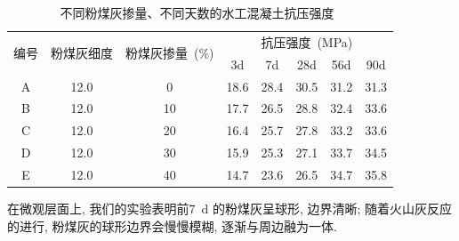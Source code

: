 \begin{table}[!t]
  \centering
  \caption{不同粉煤灰掺量、不同天数的水工混凝土抗压强度~\cite{mu_fa}}
  \begin{tabular}{|c|c|c|ccccc|}
    \hline
    \multirow{2}{*}{编号} & \multirow{2}{*}{粉煤灰细度} & \multirow{2}{*}{粉煤灰掺量~(\unit{\percent})} & \multicolumn{5}{c|}{抗压强度~(\unit{\mega\pascal})}                                                                  \\ \cline{4-8}
                          &                             &                                               & \multicolumn{1}{c|}{3d}   & \multicolumn{1}{c|}{7d}   & \multicolumn{1}{c|}{28d}  & \multicolumn{1}{c|}{56d}  & 90d  \\ \hline
    A                     & 12.0                        & 0                                             & \multicolumn{1}{c|}{18.6} & \multicolumn{1}{c|}{28.4} & \multicolumn{1}{c|}{30.5} & \multicolumn{1}{c|}{31.2} & 31.3 \\ \hline
    B                     & 12.0                        & 10                                            & \multicolumn{1}{c|}{17.7} & \multicolumn{1}{c|}{26.5} & \multicolumn{1}{c|}{28.8} & \multicolumn{1}{c|}{32.4} & 33.6 \\ \hline
    C                     & 12.0                        & 20                                            & \multicolumn{1}{c|}{16.4} & \multicolumn{1}{c|}{25.7} & \multicolumn{1}{c|}{27.8} & \multicolumn{1}{c|}{33.2} & 33.6 \\ \hline
    D                     & 12.0                        & 30                                            & \multicolumn{1}{c|}{15.9} & \multicolumn{1}{c|}{25.3} & \multicolumn{1}{c|}{27.1} & \multicolumn{1}{c|}{33.7} & 34.5 \\ \hline
    E                     & 12.0                        & 40                                            & \multicolumn{1}{c|}{14.7} & \multicolumn{1}{c|}{23.6} & \multicolumn{1}{c|}{26.5} & \multicolumn{1}{c|}{34.7} & 35.8 \\ \hline
  \end{tabular}

  \label{tab:strength_fa}
\end{table}

在微观层面上, 我们的实验表明前\SI{7}{\day} 的粉煤灰呈球形, 边界清晰; 随着火山灰反应的进行, 粉煤灰的球形边界会慢慢模糊, 逐渐与周边融为一体.